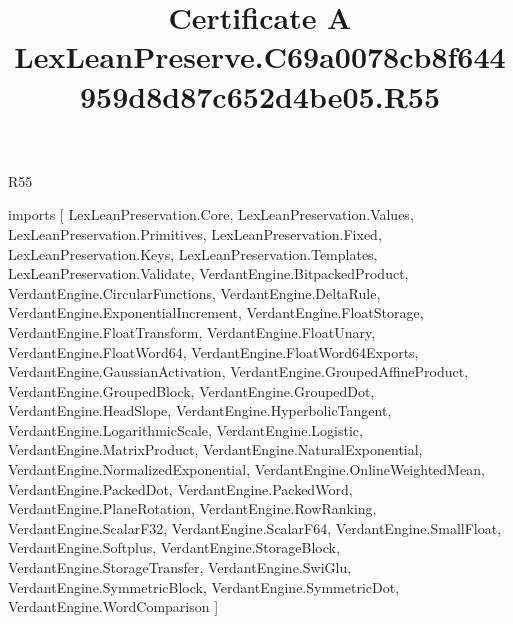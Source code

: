 \begin{lexlean}{R55}
\title{Certificate A LexLeanPreserve.C69a0078cb8f644959d8d87c652d4be05.R55}
\begin{coremodule}
imports [
  LexLeanPreservation.Core,
  LexLeanPreservation.Values,
  LexLeanPreservation.Primitives,
  LexLeanPreservation.Fixed,
  LexLeanPreservation.Keys,
  LexLeanPreservation.Templates,
  LexLeanPreservation.Validate,
  VerdantEngine.BitpackedProduct,
  VerdantEngine.CircularFunctions,
  VerdantEngine.DeltaRule,
  VerdantEngine.ExponentialIncrement,
  VerdantEngine.FloatStorage,
  VerdantEngine.FloatTransform,
  VerdantEngine.FloatUnary,
  VerdantEngine.FloatWord64,
  VerdantEngine.FloatWord64Exports,
  VerdantEngine.GaussianActivation,
  VerdantEngine.GroupedAffineProduct,
  VerdantEngine.GroupedBlock,
  VerdantEngine.GroupedDot,
  VerdantEngine.HeadSlope,
  VerdantEngine.HyperbolicTangent,
  VerdantEngine.LogarithmicScale,
  VerdantEngine.Logistic,
  VerdantEngine.MatrixProduct,
  VerdantEngine.NaturalExponential,
  VerdantEngine.NormalizedExponential,
  VerdantEngine.OnlineWeightedMean,
  VerdantEngine.PackedDot,
  VerdantEngine.PackedWord,
  VerdantEngine.PlaneRotation,
  VerdantEngine.RowRanking,
  VerdantEngine.ScalarF32,
  VerdantEngine.ScalarF64,
  VerdantEngine.SmallFloat,
  VerdantEngine.Softplus,
  VerdantEngine.StorageBlock,
  VerdantEngine.StorageTransfer,
  VerdantEngine.SwiGlu,
  VerdantEngine.SymmetricBlock,
  VerdantEngine.SymmetricDot,
  VerdantEngine.WordComparison
]


\end{coremodule}
\end{lexlean}

